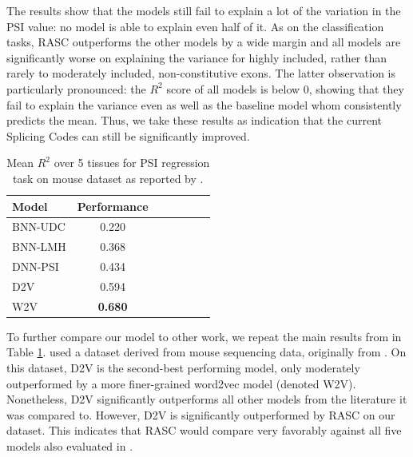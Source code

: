The results show that the models still fail to explain a lot of the variation in the PSI value: no model is able to explain even half of it. 
As on the classification tasks, RASC outperforms the other models by a wide margin and all models are significantly worse on explaining the variance for highly included, rather than rarely to moderately included, non-constitutive exons. The latter observation is particularly pronounced: the $R^2$ score of all models is below 0, showing that they fail to explain the variance even as well as the baseline model whom consistently predicts the mean. Thus, we take these results as indication that the current Splicing Codes can still be significantly improved. 




\begin{table}
	\centering
	\begin{tabular}{ l c c c c c c} 
		\hline
		Model & Performance \\
		\hline
		BNN-UDC \cite{jha} & 0.220\\
		BNN-LMH \cite{jha}& 0.368\\
		DNN-PSI \cite{jha} & 0.434\\
		D2V \cite{d2vsplicing} & 0.594\\
		W2V \cite{d2vsplicing} & \textbf{0.680}\\
		\hline
	\end{tabular}
	\caption{Mean $R^2$ over 5 tissues for PSI regression task on mouse dataset as reported by \cite{d2vsplicing}. 
	}
	\label{table:ieee_regression}
\end{table}

To further compare our model to other work, we repeat the main results from \cite{d2vsplicing} in Table \ref{table:ieee_regression}. \cite{d2vsplicing} used a dataset derived from mouse sequencing data, originally from \cite{jha}. On this dataset, D2V is the second-best performing model, only moderately outperformed by a more finer-grained word2vec model (denoted W2V). Nonetheless, D2V significantly outperforms all other models from the literature it was compared to. 
However, D2V is significantly outperformed by RASC on our dataset. This indicates that RASC would compare very favorably against all five models also evaluated in \cite{d2vsplicing}. 


